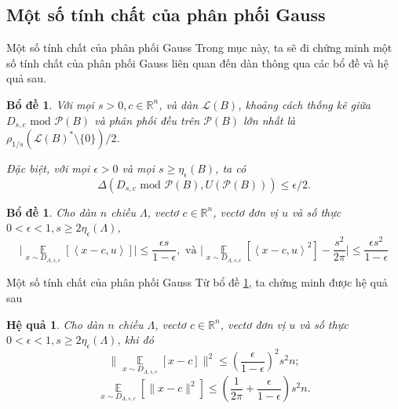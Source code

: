 \documentclass[notheorems,envcountsect,serif,12pt]{beamer}
\providecommand{\abs}[1]{\lvert#1\rvert}
\providecommand{\norm}[1]{\lVert#1\rVert}
\providecommand{\vt}[1]{\left\langle#1\right\rangle}
\newcommand{\R}{\mathbb{R}}
\newcommand{\E}{\mathbb{E}}
\numberwithin{equation}{section}
\newtheorem{lemma}[theorem]{Bổ đề}
\newtheorem{corollary}[theorem]{Hệ quả}
\theoremstyle{definition}
\numberwithin{equation}{section}
\begin{document}
\subsection{Một số tính chất của phân phối Gauss}\label{Gauss}
\begin{frame}{Một số tính chất của phân phối Gauss}
	Trong mục này, ta sẽ đi chứng minh một số tính chất của phân phối Gauss liên quan đến dàn thông qua các bổ đề và hệ quả sau.\pause
	\begin{lemma}\label{Gauss_BD1}
		Với mọi $s>0, c\in \R^n$, và dàn $\mathcal{L}(B)$, khoảng cách thống kê giữa $D_{s,c}\text{ mod } \mathcal{P}(B)$ và phân phối đều trên $\mathcal{P}(B)$ lớn nhất là $\rho_{1/s}\left(\mathcal{L}(B)^*\setminus\{0\}\right)/2$.
		
		Đặc biệt, với mọi $\epsilon >0$ và mọi $s\ge \eta_\epsilon(B)$, ta có $$\Delta\left(D_{s,c}\text{ mod }\mathcal{P}(B),U(\mathcal{P}(B))\right)\le\epsilon/2.$$
	\end{lemma}\pause
	\begin{lemma}\label{Gauss_BD2}
		Cho dàn $n$ chiều $\Lambda$, vectơ $c\in \R^n$, vectơ đơn vị $u$ và số thực $0<\epsilon <1, s\ge 2\eta_\epsilon(\Lambda)$, $$\abs{\mathop \E\limits_{x\sim D_{\Lambda, s, c}}\left[\vt{x-c, u}\right]}\le \frac{\epsilon s}{1-\epsilon}, \text{ và }\abs{\mathop \E\limits_{x\sim D_{\Lambda, s, c}}\left[\vt{x-c, u}^2\right]-\frac{s^2}{2\pi}}\le \frac{\epsilon s^2}{1-\epsilon}$$
	\end{lemma}
\end{frame}
\begin{frame}{Một số tính chất của phân phối Gauss}
Từ bổ đề \ref{Gauss_BD2}, ta chứng minh được hệ quả sau\pause
\begin{corollary}\label{Gauss_HQ}
	Cho dàn $n$ chiều $\Lambda$, vectơ $c\in \R^n$, vectơ đơn vị $u$ và số thực $0<\epsilon <1, s\ge 2\eta_\epsilon(\Lambda)$, khi đó $$\norm{\mathop \E\limits_{x\sim D_{\Lambda, s, c}}\left[x-c\right]}^2\le \left(\frac{\epsilon}{1-\epsilon}\right)^2s^2n;$$ $$\mathop \E\limits_{x\sim D_{\Lambda, s, c}}\left[\norm{x-c}^2\right]\le \left(\frac{1}{2\pi}+\frac{\epsilon}{1-\epsilon}\right)s^2n.$$
\end{corollary}
\end{frame}
\end{document}
